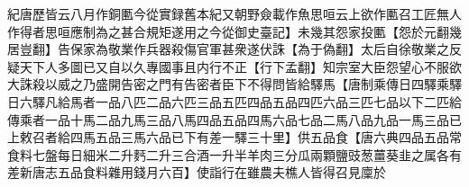 紀唐歷皆云八月作銅匭今從實録舊本紀又朝野僉載作魚思咺云上欲作匭召工匠無人作得者思咺應制為之甚合規矩遂用之今從御史臺記】未幾其怨家投匭【怨於元翻幾居豈翻】告保家為敬業作兵器殺傷官軍甚衆遂伏誅【為于偽翻】太后自徐敬業之反疑天下人多圖已又自以久專國事且内行不正【行下孟翻】知宗室大臣怨望心不服欲大誅殺以威之乃盛開告密之門有告密者臣下不得問皆給驛馬【唐制乘傳日四驛乘驛日六驛凡給馬者一品八匹二品六匹三品五匹四品五品四匹六品三匹七品以下二匹給傳乘者一品十馬二品九馬三品八馬四品五品四馬六品七品二馬八品九品一馬三品已上敕召者給四馬五品三馬六品已下有差一驛三十里】供五品食【唐六典四品五品常食料七盤每日細米二升麫二升三合酒一升半羊肉三分瓜兩顆鹽豉葱薑葵韭之属各有差新唐志五品食料雜用錢月六百】使詣行在雖農夫樵人皆得召見廩於